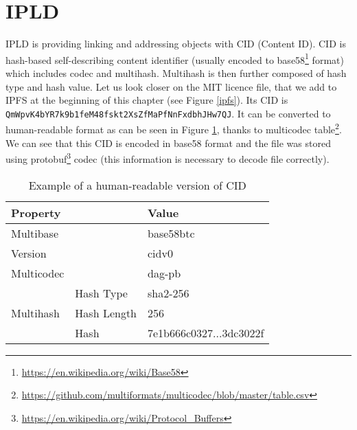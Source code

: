


\section{IPLD}
IPLD is providing linking and addressing objects with CID (Content ID). CID is hash-based self-describing content identifier (usually encoded to base58\footnote{\url{https://en.wikipedia.org/wiki/Base58}} format) which includes codec and multihash. Multihash is then further composed of hash type and hash value. Let us look closer on the MIT licence file, that we add to IPFS at the beginning of this chapter (see Figure \ref{ipfs}). Its CID is \texttt{QmWpvK4bYR7k9b1feM48fsk\-t2XsZfMaPfNnFxdbhJHw7QJ}. It can be converted to human-readable format as can be seen in Figure \ref{tab:CIDexample}, thanks to multicodec table\footnote{\url{https://github.com/multiformats/multicodec/blob/master/table.csv}}. We can see that this CID is encoded in base58 format and the file was stored using protobuf\footnote{\url{https://en.wikipedia.org/wiki/Protocol\_Buffers}} codec (this information is necessary to decode file correctly).



\begin{table}[]
    \centering
    \begin{tabular}{|ll|l|}
    \hline
    \textbf{Property}                  &             & \textbf{Value}                                                            \\ \hline
    Multibase                                        &             & base58btc                                                        \\ \hline
    Version                                          &             & cidv0                                                            \\ \hline
    Multicodec                                       &             & dag-pb                                                           \\ \hline
    \multicolumn{1}{|l|}{\multirow{3}{*}{Multihash}} & Hash Type   & sha2-256                                                         \\ \cline{2-3} 
    \multicolumn{1}{|l|}{}                           & Hash Length & 256                                                              \\ \cline{2-3} 
    \multicolumn{1}{|l|}{}                           & Hash        & 7e1b666c0327...3dc3022f \\ \hline
    \end{tabular}
    \caption{Example of a human-readable version of CID}
    \label{tab:CIDexample}
\end{table}

